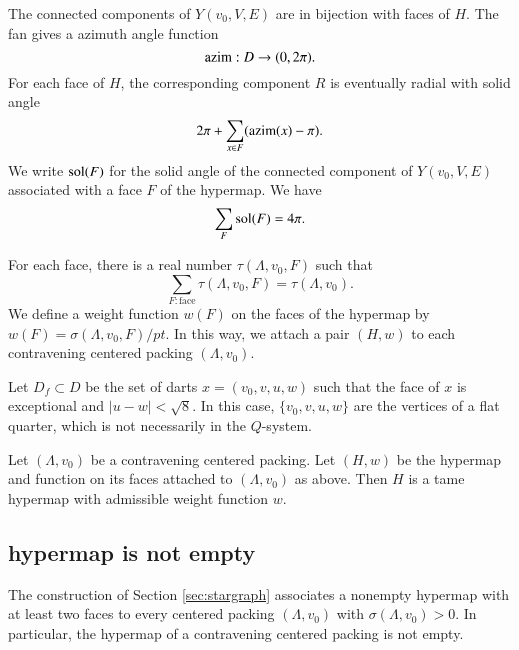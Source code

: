 The connected components of $Y(v_0,V,E)$ are in bijection with
faces of $H$.  
The fan gives a azimuth angle function
$$
{\operatorname{azim}} : D \to (0,2\pi).
$$
For each face of $H$, the corresponding component $R$
is eventually radial with solid
angle
  $$
  2\pi + \sum_{x\in F} ({\operatorname{azim}}(x) -\pi).
  $$
We write $\operatorname{sol}(F)$ for the solid angle of the connected component
of $Y(v_0,V,E)$ associated with a face $F$ of the hypermap.
We have
    $$\sum_{F} \operatorname{sol}(F) = 4\pi.$$


For each face, there is a
real number $\tau(\Lambda,v_0,F)$ such that
$$
  \sum_{F : \text{face}}\tau(\Lambda,v_0,F) = \tau(\Lambda,v_0).
$$
We define a weight function $w(F)$ on the faces of the hypermap
by $w(F) = \sigma(\Lambda,v_0,F)/pt$.  In this way, we attach
a pair $(H,w)$ to each contravening centered packing $(\Lambda,v_0)$.


Let $D_f\subset D$ be the set of darts 
   $x = (v_0,v,u,w)$
such that the face of $x$ is exceptional and $|u-w|<\sqrt8$.
In this case, $\{v_0,v,u,w\}$ are the vertices of a flat quarter,
which is not necessarily in the $Q$-system.

\begin{theorem} \label{theorem:contravene}
Let $(\Lambda,v_0)$ be a contravening centered packing.  Let $(H,w)$ be
the hypermap and function on its faces attached to $(\Lambda,v_0)$ as above.
Then $H$ is a tame hypermap with admissible weight function $w$.
\end{theorem}

\subsection{hypermap is not empty}




\begin{lemma}
\label{prop:nonempty} The construction of Section
\ref{sec:stargraph} associates a nonempty hypermap with at least
two faces to every centered packing $(\Lambda,v_0)$ with $\sigma(\Lambda,v_0)>0$.
In particular, the hypermap of a contravening centered packing is not empty.
\end{lemma}

